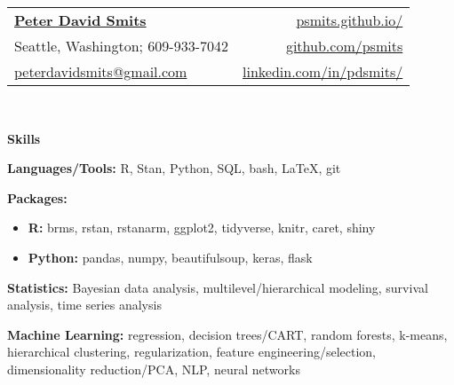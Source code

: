 \documentclass[letterpaper,11pt]{article}
\newcommand{\resheading}[1]{
  {\large \colorbox{mygrey}{\begin{minipage}{\textwidth}{\textbf{#1 \vphantom{p\^{E}}}}\end{minipage}}}
}
\begin{document}
\newcommand{\mywebheader}{
  \begin{tabular*}{7in}{l@{\extracolsep{\fill}}r}
    \textbf{\href{https://psmits.github.io/}{\Large Peter David Smits}} & \href{https://psmits.github.io/}{psmits.github.io/} \\
    Seattle, Washington; 609-933-7042 & \href{https://github.com/psmits}{github.com/psmits} \\
    \href{mailto:peterdavidsmits@gmail.com}{peterdavidsmits@gmail.com} & \href{https://www.linkedin.com/in/pdsmits/}{linkedin.com/in/pdsmits/} \\
  \end{tabular*}
  \\
\vspace{0.05in}
}

\mywebheader



\resheading{Skills}
\begin{description}[itemsep=-1mm]
    \item \textbf{Languages/Tools:}  R, Stan, Python, SQL, bash, \LaTeX, git
    \item \textbf{Packages:} \vspace{-5pt}
      \begin{itemize}[itemsep=-1mm]
        \item \textbf{R:} brms, rstan, rstanarm, ggplot2, tidyverse, knitr, caret, shiny
        \item \textbf{Python:} pandas, numpy, beautifulsoup, keras, flask
      \end{itemize}
    \item \textbf{Statistics:} Bayesian data analysis, multilevel/hierarchical modeling, survival analysis, time series analysis
    \item \textbf{Machine Learning:} regression, decision trees/CART, random forests, k-means, hierarchical clustering, regularization, feature engineering/selection, dimensionality reduction/PCA, NLP, neural networks
\end{description} %
\vspace{0.05in}
\end{document}
